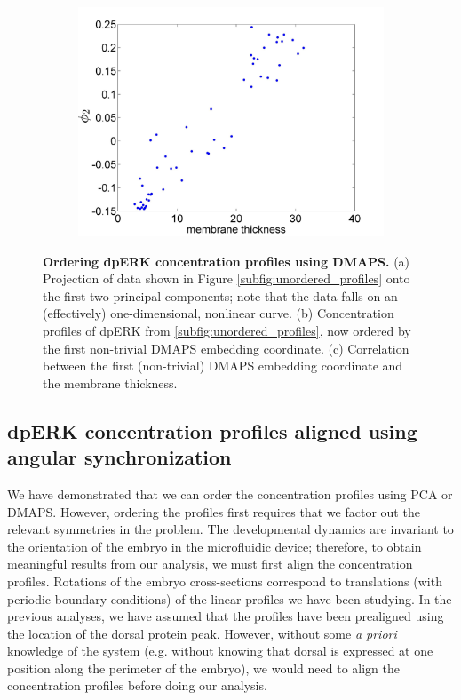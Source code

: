 \documentclass[10pt]{article}
\begin{document}
\begin{figure}[!ht]
\begin{subfigure}{0.3\textwidth}
\includegraphics[width=\textwidth]{DMAPS_time_corr}
\caption{}
\end{subfigure}
\caption{{\bf Ordering dpERK concentration profiles using DMAPS.} (a) Projection of data shown in Figure \ref{subfig:unordered_profiles} onto the first two principal components; note that the data falls on an (effectively) one-dimensional, nonlinear curve. 
(b) Concentration profiles of dpERK from \ref{subfig:unordered_profiles}, now ordered by the first non-trivial DMAPS embedding coordinate.
(c) Correlation between the first (non-trivial) DMAPS embedding coordinate and the membrane thickness.}
\label{fig:DMAPS_ordering}
\end{figure}

\subsection*{dpERK concentration profiles aligned using angular synchronization}

We have demonstrated that we can order the concentration profiles using PCA or DMAPS.
%
However, ordering the profiles first requires that we factor out the relevant symmetries in the problem.
%
The developmental dynamics are invariant to the orientation of the embryo in the microfluidic device; therefore, to obtain meaningful results from our analysis, we must first align the concentration profiles.
%
Rotations of the embryo cross-sections correspond to translations (with periodic boundary conditions) of the linear profiles we have been studying.
%
In the previous analyses, we have assumed that the profiles have been prealigned using the location of the dorsal protein peak.
%
However, without some {\em a priori} knowledge of the system (e.g. without knowing that dorsal is expressed at one position along the perimeter of the embryo), we would need to align the concentration profiles before doing our analysis.
\end{document}
